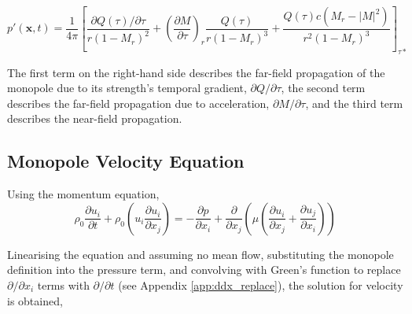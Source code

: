 
\begin{equation}
    p'(\bm{x}, t) = \frac{1}{4\pi} \left[ 
    \frac{\partial Q(\tau) / \partial \tau}{r(1-M_r)^2} +
    \left(\frac{\partial M}{\partial \tau} \right)_r \frac{Q(\tau)}{r(1-M_r)^3} +
    \frac{Q(\tau) c (M_r - |M|^2)}{r^2(1-M_r)^3}
    \right]_{\tau*}
    \label{eq:monopole_p_der}
\end{equation}

The first term on the right-hand side describes the far-field propagation of the monopole due to its strength's temporal gradient, $\partial Q/\partial\tau$, the second term describes the far-field propagation due to acceleration, $\partial M/\partial \tau$, and the third term describes the near-field propagation.

\subsection{Monopole Velocity Equation} \label{subsec:monopole_u}

Using the momentum equation,
\begin{equation}
    \rho_0 \frac{\partial u_i}{\partial t} +
    \rho_0 \left( u_i \frac{\partial u_i}{\partial x_j} \right) =
    -\frac{\partial p}{\partial x_i} +
    \frac{\partial}{\partial x_j} \left(
    \mu \left(\frac{\partial u_i}{\partial x_j} + \frac{\partial u_j}{\partial x_i} \right)
    \right)
    \label{eq:momentum_eq}
\end{equation}

Linearising the equation and assuming no mean flow, substituting the monopole definition into the pressure term, and convolving with Green's function to replace $\partial/\partial x_i$ terms with $\partial/\partial t$ (see Appendix \ref{app:ddx_replace}), the solution for velocity is obtained, %


